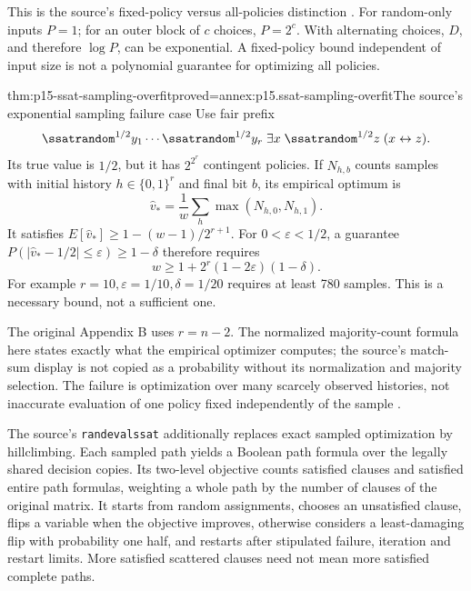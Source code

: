 This is the source's fixed-policy versus all-policies distinction
\cite[sec.~2.3, Lemma~4 and Theorem~5, pp.~21--30]{LittmanMajercikPitassi2000SSATAuthor}.
For random-only inputs \(P=1\); for an outer block of \(c\) choices,
\(P=2^c\). With alternating choices, \(D\), and therefore
\(\log P\), can be exponential. A fixed-policy bound independent
of input size is not a polynomial guarantee for optimizing all policies.

\begin{hbtheorem}{thm:p15-ssat-sampling-overfit}{proved=annex:p15.ssat-sampling-overfit}{The source's exponential sampling failure case}
Use fair prefix
\[
 \ssatrandom^{1/2}y_1\cdots\ssatrandom^{1/2}y_r\;
 \exists x\;\ssatrandom^{1/2}z\;(x\leftrightarrow z).
\]
Its true value is \(1/2\), but it has \(2^{2^r}\) contingent
policies. If \(N_{h,b}\) counts samples with initial history
\(h\in\{0,1\}^r\) and final bit \(b\), its empirical optimum
is
\[
 \widehat v_* =\frac1w\sum_h\max(N_{h,0},N_{h,1}).
\]
It satisfies
\(E[\widehat v_*]\geq1-(w-1)/2^{r+1}\).
For \(0<\varepsilon<1/2\), a guarantee
\(P(|\widehat v_*-1/2|\leq\varepsilon)\geq1-\delta\)
therefore requires
\[
 w\geq1+2^r(1-2\varepsilon)(1-\delta).
\]
For example \(r=10,\varepsilon=1/10,\delta=1/20\) requires
at least 780 samples. This is a necessary bound, not a sufficient one.
\end{hbtheorem}

The original Appendix B uses \(r=n-2\). The normalized majority-count
formula here states exactly what the empirical optimizer computes;
the source's match-sum display is not copied as a probability without
its normalization and majority selection. The failure is optimization
over many scarcely observed histories, not inaccurate evaluation of
one policy fixed independently of the sample
\cite[Appendix~B, pp.~49--50]{LittmanMajercikPitassi2000SSATAuthor}.

The source's \texttt{randevalssat} additionally replaces exact sampled
optimization by hillclimbing. Each sampled path yields a Boolean path
formula over the legally shared decision copies. Its two-level objective
counts satisfied clauses and satisfied entire path formulas, weighting
a whole path by the number of clauses of the original matrix. It starts
from random assignments, chooses an unsatisfied clause, flips a variable
when the objective improves, otherwise considers a least-damaging flip
with probability one half, and restarts after stipulated failure,
iteration and restart limits. More satisfied scattered clauses need not
mean more satisfied complete paths.

